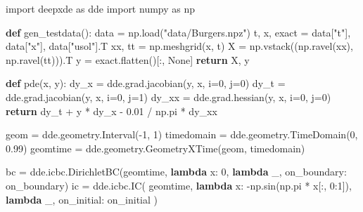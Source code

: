 \documentclass[
  spanish,
  us-letterpaper,
  DIV=11,
  numbers=noendperiod]{scrreprt}
\newenvironment{Shaded}{\begin{snugshade}}{\end{snugshade}}
\newcommand{\ControlFlowTok}[1]{\textcolor[rgb]{0.00,0.23,0.31}{\textbf{#1}}}
\newcommand{\DecValTok}[1]{\textcolor[rgb]{0.68,0.00,0.00}{#1}}
\newcommand{\FloatTok}[1]{\textcolor[rgb]{0.68,0.00,0.00}{#1}}
\newcommand{\ImportTok}[1]{\textcolor[rgb]{0.00,0.46,0.62}{#1}}
\newcommand{\KeywordTok}[1]{\textcolor[rgb]{0.00,0.23,0.31}{\textbf{#1}}}
\newcommand{\NormalTok}[1]{\textcolor[rgb]{0.00,0.23,0.31}{#1}}
\newcommand{\OperatorTok}[1]{\textcolor[rgb]{0.37,0.37,0.37}{#1}}
\newcommand{\StringTok}[1]{\textcolor[rgb]{0.13,0.47,0.30}{#1}}
\newcommand{\VariableTok}[1]{\textcolor[rgb]{0.07,0.07,0.07}{#1}}
\theoremstyle{definition}
\theoremstyle{plain}
\theoremstyle{remark}
\begin{document}
\begin{Shaded}
\begin{Highlighting}[]
\ImportTok{import}\NormalTok{ deepxde }\ImportTok{as}\NormalTok{ dde}
\ImportTok{import}\NormalTok{ numpy }\ImportTok{as}\NormalTok{ np}


\KeywordTok{def}\NormalTok{ gen\_testdata():}
\NormalTok{    data }\OperatorTok{=}\NormalTok{ np.load(}\StringTok{"data/Burgers.npz"}\NormalTok{)}
\NormalTok{    t, x, exact }\OperatorTok{=}\NormalTok{ data[}\StringTok{"t"}\NormalTok{], data[}\StringTok{"x"}\NormalTok{], data[}\StringTok{"usol"}\NormalTok{].T}
\NormalTok{    xx, tt }\OperatorTok{=}\NormalTok{ np.meshgrid(x, t)}
\NormalTok{    X }\OperatorTok{=}\NormalTok{ np.vstack((np.ravel(xx), np.ravel(tt))).T}
\NormalTok{    y }\OperatorTok{=}\NormalTok{ exact.flatten()[:, }\VariableTok{None}\NormalTok{]}
    \ControlFlowTok{return}\NormalTok{ X, y}


\KeywordTok{def}\NormalTok{ pde(x, y):}
\NormalTok{    dy\_x }\OperatorTok{=}\NormalTok{ dde.grad.jacobian(y, x, i}\OperatorTok{=}\DecValTok{0}\NormalTok{, j}\OperatorTok{=}\DecValTok{0}\NormalTok{)}
\NormalTok{    dy\_t }\OperatorTok{=}\NormalTok{ dde.grad.jacobian(y, x, i}\OperatorTok{=}\DecValTok{0}\NormalTok{, j}\OperatorTok{=}\DecValTok{1}\NormalTok{)}
\NormalTok{    dy\_xx }\OperatorTok{=}\NormalTok{ dde.grad.hessian(y, x, i}\OperatorTok{=}\DecValTok{0}\NormalTok{, j}\OperatorTok{=}\DecValTok{0}\NormalTok{)}
    \ControlFlowTok{return}\NormalTok{ dy\_t }\OperatorTok{+}\NormalTok{ y }\OperatorTok{*}\NormalTok{ dy\_x }\OperatorTok{{-}} \FloatTok{0.01} \OperatorTok{/}\NormalTok{ np.pi }\OperatorTok{*}\NormalTok{ dy\_xx}


\NormalTok{geom }\OperatorTok{=}\NormalTok{ dde.geometry.Interval(}\OperatorTok{{-}}\DecValTok{1}\NormalTok{, }\DecValTok{1}\NormalTok{)}
\NormalTok{timedomain }\OperatorTok{=}\NormalTok{ dde.geometry.TimeDomain(}\DecValTok{0}\NormalTok{, }\FloatTok{0.99}\NormalTok{)}
\NormalTok{geomtime }\OperatorTok{=}\NormalTok{ dde.geometry.GeometryXTime(geom, timedomain)}

\NormalTok{bc }\OperatorTok{=}\NormalTok{ dde.icbc.DirichletBC(geomtime, }\KeywordTok{lambda}\NormalTok{ x: }\DecValTok{0}\NormalTok{, }\KeywordTok{lambda}\NormalTok{ \_, on\_boundary: on\_boundary)}
\NormalTok{ic }\OperatorTok{=}\NormalTok{ dde.icbc.IC(}
\NormalTok{    geomtime, }\KeywordTok{lambda}\NormalTok{ x: }\OperatorTok{{-}}\NormalTok{np.sin(np.pi }\OperatorTok{*}\NormalTok{ x[:, }\DecValTok{0}\NormalTok{:}\DecValTok{1}\NormalTok{]), }\KeywordTok{lambda}\NormalTok{ \_, on\_initial: on\_initial}
\NormalTok{)}


\end{Highlighting}
\end{Shaded}
\end{document}
